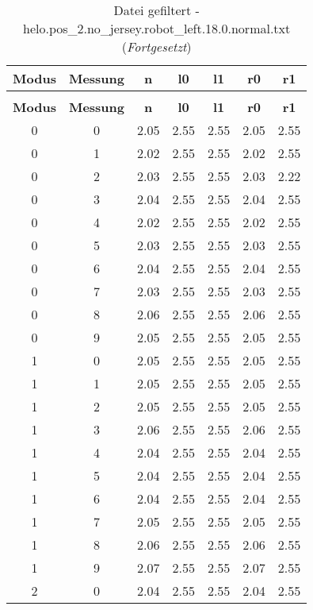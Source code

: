 \begin{longtable}{|c|c||c||c|c||c|c|}
	\caption{Datei gefiltert - helo.pos\_2.no\_jersey.robot\_left.18.0.normal.txt} \label{tab:helo.pos-2.no-jersey.robot-left.18.0.normal.txt} \\ \hline
	\textbf{Modus} & \textbf{Messung} & \textbf{n} & \textbf{l0} & \textbf{l1} & \textbf{r0} & \textbf{r1}\\ \hline
	\endfirsthead
	\caption[]{Datei gefiltert - helo.pos\_2.no\_jersey.robot\_left.18.0.normal.txt (\emph{Fortgesetzt})} \\ \hline
	\textbf{Modus} & \textbf{Messung} & \textbf{n} & \textbf{l0} & \textbf{l1} & \textbf{r0} & \textbf{r1}\\ \hline
	\endhead
	0 & 0 & 2.05 & 2.55 & 2.55 & 2.05 & 2.55 \\ \hline
	0 & 1 & 2.02 & 2.55 & 2.55 & 2.02 & 2.55 \\ \hline
	0 & 2 & 2.03 & 2.55 & 2.55 & 2.03 & 2.22 \\ \hline
	0 & 3 & 2.04 & 2.55 & 2.55 & 2.04 & 2.55 \\ \hline
	0 & 4 & 2.02 & 2.55 & 2.55 & 2.02 & 2.55 \\ \hline
	0 & 5 & 2.03 & 2.55 & 2.55 & 2.03 & 2.55 \\ \hline
	0 & 6 & 2.04 & 2.55 & 2.55 & 2.04 & 2.55 \\ \hline
	0 & 7 & 2.03 & 2.55 & 2.55 & 2.03 & 2.55 \\ \hline
	0 & 8 & 2.06 & 2.55 & 2.55 & 2.06 & 2.55 \\ \hline
	0 & 9 & 2.05 & 2.55 & 2.55 & 2.05 & 2.55 \\ \hline
	1 & 0 & 2.05 & 2.55 & 2.55 & 2.05 & 2.55 \\ \hline
	1 & 1 & 2.05 & 2.55 & 2.55 & 2.05 & 2.55 \\ \hline
	1 & 2 & 2.05 & 2.55 & 2.55 & 2.05 & 2.55 \\ \hline
	1 & 3 & 2.06 & 2.55 & 2.55 & 2.06 & 2.55 \\ \hline
	1 & 4 & 2.04 & 2.55 & 2.55 & 2.04 & 2.55 \\ \hline
	1 & 5 & 2.04 & 2.55 & 2.55 & 2.04 & 2.55 \\ \hline
	1 & 6 & 2.04 & 2.55 & 2.55 & 2.04 & 2.55 \\ \hline
	1 & 7 & 2.05 & 2.55 & 2.55 & 2.05 & 2.55 \\ \hline
	1 & 8 & 2.06 & 2.55 & 2.55 & 2.06 & 2.55 \\ \hline
	1 & 9 & 2.07 & 2.55 & 2.55 & 2.07 & 2.55 \\ \hline
	2 & 0 & 2.04 & 2.55 & 2.55 & 2.04 & 2.55 \\ \hline

\end{longtable}
